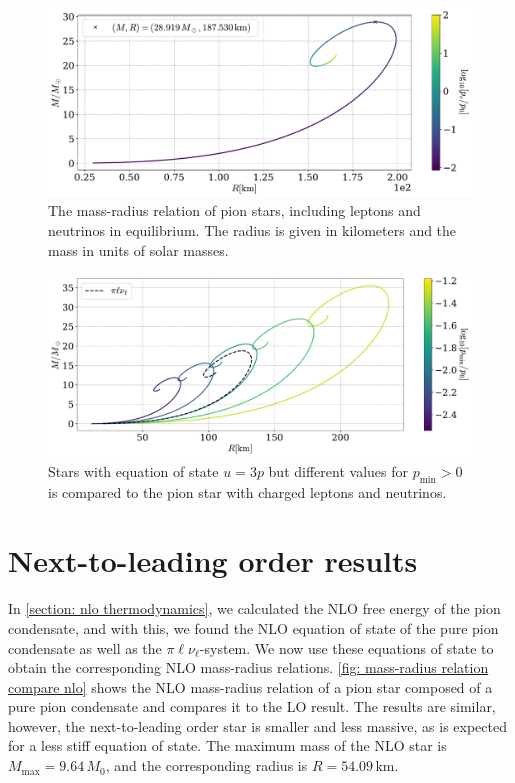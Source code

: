 \begin{figure}[!htb]
    \centering
    \includegraphics[width=.85\textwidth]{../scripts/figurer/pion_star/mass_radius_neutrino.pdf}
    \caption{
        The mass-radius relation of pion stars, including leptons and neutrinos in equilibrium.
        The radius is given in kilometers and the mass in units of solar masses.
        }
        \label{fig: mass radius neutrino}
\end{figure}


\begin{figure}[!htb]
    \centering
    \includegraphics[width=.85\textwidth]{../scripts/figurer/pion_star/mass_radius_light.pdf}
    \caption{Stars with equation of state $u = 3p$ but different values for $p_\text{min}>0$ is compared to the pion star with charged leptons and neutrinos.}
    \label{fig: light stars}
\end{figure}


\FloatBarrier
\section{Next-to-leading order results}

In \autoref{section: nlo thermodynamics}, we calculated the NLO free energy of the pion condensate, and with this, we found the NLO equation of state of the pure pion condensate as well as the $\pi\ell\nu_\ell$-system.
We now use these equations of state to obtain the corresponding NLO mass-radius relations.
\autoref{fig: mass-radius relation compare nlo} shows the NLO mass-radius relation of a pion star composed of a pure pion condensate and compares it to the LO result.
The results are similar, however, the next-to-leading order star is smaller and less massive, as is expected for a less stiff equation of state.
The maximum mass of the NLO star is $M_\text{max} = 9.64\, M_0$, and the corresponding radius is $R = 54.09\,\text{km}$.

